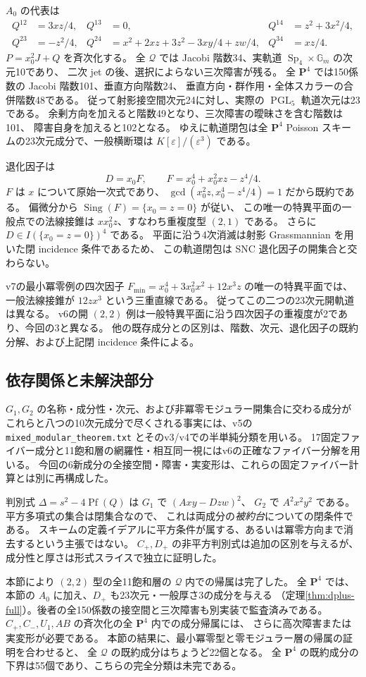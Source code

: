 $A_0$ の代表は
\begin{align*}
 Q^{12}&=3xz/4,&Q^{13}&=0,&Q^{14}&=z^2+3x^2/4,\\
 Q^{23}&=-z^2/4,&Q^{24}&=x^2+2xz+3z^2-3xy/4+zw/4,&Q^{34}&=xz/4.
\end{align*}
$P=x_0^2J+Q$ を斉次化する。
全 $\mathcal Q$ では Jacobi 階数34、実軌道 $\operatorname{Sp}_4\times\mathbb G_m$ の次元10であり、
二次 jet の後、選択によらない三次障害が残る。
全 $\mathbf P^4$ では150係数の Jacobi 階数101、垂直方向階数24、
垂直方向・群作用・全体スカラーの合併階数48である。
従って射影接空間次元24に対し、実際の $\operatorname{PGL}_5$ 軌道次元は23である。
余剰方向を加えると階数49となり、三次障害の曖昧さを含む階数は101、
障害自身を加えると102となる。
ゆえに軌道閉包は全 $\mathbf P^4$ Poisson スキームの23次元成分で、一般横断環は
$K[\varepsilon]/(\varepsilon^3)$ である。

退化因子は
\[
 D=x_0F,\qquad F=x_0^4+x_0^2xz-z^4/4.
\]
$F$ は $x$ について原始一次式であり、
$\gcd(x_0^2z,x_0^4-z^4/4)=1$ だから既約である。
偏微分から $\operatorname{Sing}(F)=\{x_0=z=0\}$ が従い、
この唯一の特異平面の一般点での法線接錐は $x x_0^2z$、すなわち重複度型 $(2,1)$ である。
さらに $D\in I(\{x_0=z=0\})^4$ である。
平面に沿う4次消滅は射影 Grassmannian を用いた閉 incidence 条件であるため、
この軌道閉包は SNC 退化因子の開集合と交わらない。

v7の最小冪零例の四次因子
$F_{\min}=x_0^4+3x_0^2x^2+12x^3z$ の唯一の特異平面では、
一般法線接錐が $12z x^3$ という三重直線である。
従ってこの二つの23次元開軌道は異なる。
v6の開 $(2,2)$ 例は一般特異平面に沿う四次因子の重複度が2であり、今回の3と異なる。
他の既存成分との区別は、階数、次元、退化因子の既約分解、および上記閉 incidence 条件による。

\subsection{依存関係と未解決部分}

$G_1,G_2$ の名称・成分性・次元、および非冪零モジュラー開集合に交わる成分が
これらと八つの10次元成分で尽くされる事実には、v5の
\texttt{mixed\_modular\_theorem.txt} とそのv3/v4での半単純分類を用いる。
17固定ファイバー成分と11飽和層の網羅性・相互同一視にはv6の正確なファイバー分解を用いる。
今回の6新成分の全接空間・障害・実変形は、これらの固定ファイバー計算とは別に再構成した。

判別式 $\Delta=s^2-4\operatorname{Pf}(Q)$ は $G_1$ で $(Axy-Dzw)^2$、
$G_2$ で $A^2x^2y^2$ である。平方多項式の集合は閉集合なので、
これは両成分の\emph{被約台}についての閉条件である。
スキームの定義イデアルに平方条件が属する、あるいは冪零方向まで消去するという主張ではない。
$C_+,D_+$ の非平方判別式は追加の区別を与えるが、成分性と厚さは形式スライスで独立に証明した。

本節により $(2,2)$ 型の全11飽和層の $\mathcal Q$ 内での帰属は完了した。
全 $\mathbf P^4$ では、本節の $A_0$ に加え、$D_+$ も23次元・一般厚さ3の成分を与える
（定理\ref{thm:dplus-full}）。後者の全150係数の接空間と三次障害も別実装で監査済みである。
$C_+,C_-,U_1,AB$ の斉次化の全 $\mathbf P^4$ 内での成分帰属には、
さらに高次障害または実変形が必要である。
本節の結果に、最小冪零型と零モジュラー層の帰属の証明を合わせると、
全 $\mathcal Q$ の既約成分はちょうど22個となる。
全 $\mathbf P^4$ の既約成分の下界は55個であり、こちらの完全分類は未完である。
